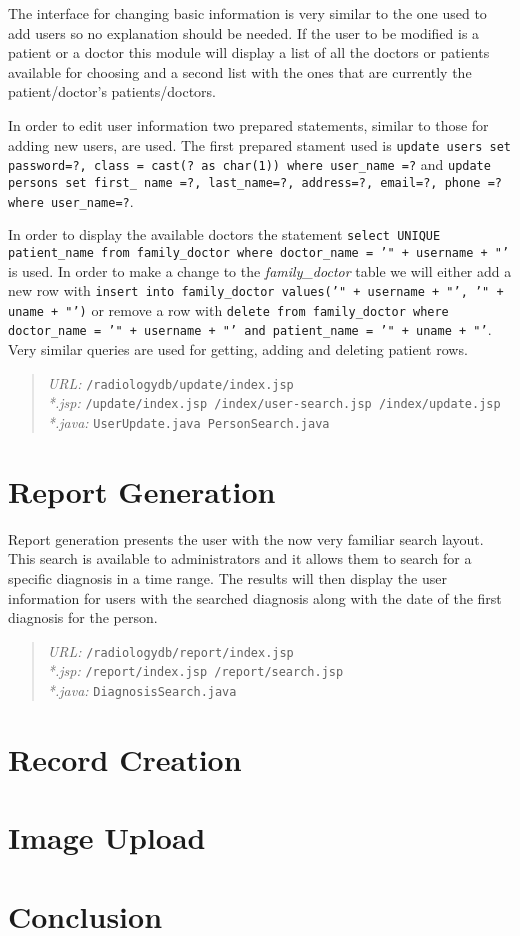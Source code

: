 \documentclass[11pt]{report}
\begin{document}
The interface for changing basic information is very similar to the one used to add users so no explanation should be needed. If the user to be modified is a patient or a doctor this module will display a list of all the doctors or patients available for choosing and a second list with the ones that are currently the patient/doctor's patients/doctors.

In order to edit user information two prepared statements, similar to those for adding new users, are used. The first prepared stament used is \texttt{update users set password=?, class = cast(? as char(1)) where user\_name =?} and \texttt{update persons set first\_ name =?, last\_name=?, address=?, email=?, phone =? where user\_name=?}.

In order to display the available doctors the statement \texttt{select UNIQUE patient\_name from family\_doctor where doctor\_name = '" + username + "'} is used. In order to make a change to the \emph{family\_doctor} table we will either add a new row with \texttt{insert into family\_doctor values('" + username + "', '" + uname + "')} or remove a row with \texttt{delete from family\_doctor where doctor\_name = '" + username + "' and patient\_name = '" + uname + "'}. Very similar queries are used for getting, adding and deleting patient rows.

\begin{quote}
\emph{URL:} \texttt{/radiologydb/update/index.jsp} \\
\emph{*.jsp: } \texttt{/update/index.jsp /index/user-search.jsp /index/update.jsp} \\
\emph{*.java: } \texttt{UserUpdate.java PersonSearch.java}
\end{quote}

\section*{Report Generation}
Report generation presents the user with the now very familiar search layout. This search is available to administrators and it allows them to search for a specific diagnosis in a time range. The results will then display the user information for users with the searched diagnosis along with the date of the first diagnosis for the person.

\begin{quote}
\emph{URL:} \texttt{/radiologydb/report/index.jsp} \\
\emph{*.jsp: } \texttt{/report/index.jsp /report/search.jsp} \\
\emph{*.java: } \texttt{DiagnosisSearch.java}
\end{quote}

\section*{Record Creation}

\section*{Image Upload}

\section*{Conclusion}
\end{document}
